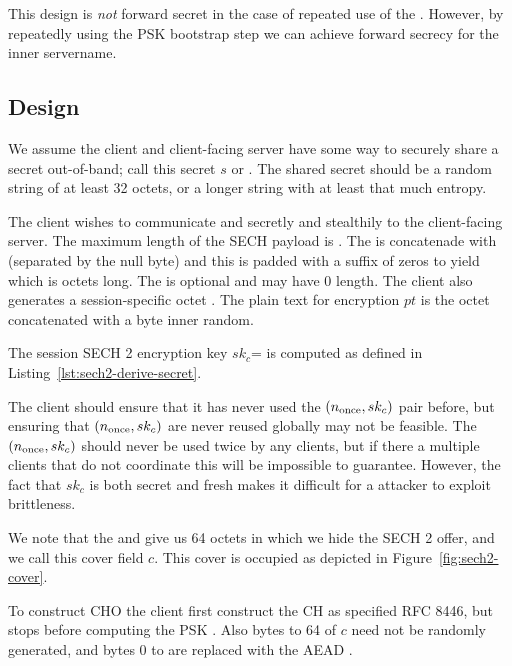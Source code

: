 This design is {\em not} forward secret in the case of repeated use of the \varsechlongtermkey{}.
However, by repeatedly using the \ac{PSK} bootstrap step we can achieve forward secrecy for the inner servername.

\subsection{Design}

We assume the client and client-facing server have some way to securely share a secret out-of-band; call this secret $s$ or \varsechlongtermkey{}.
The shared secret should be a random string of at least 32 octets, or a longer string with at least that much entropy.

The client wishes to communicate  and  secretly and stealthily to the client-facing server.
The maximum length of the \ac{SECH} payload is \sechtwoservernamelen{}.
The  is concatenade with  (separated by the null byte)
and this is padded
with a suffix of zeros to yield  which is \sechtwoservernamelen{} octets long.
The  is optional and may have 0 length.
The client also generates a session-specific \sechtwoivlen{} octet \nonce.
The plain text for encryption $pt$ is the \sechtwoservernamelen{} octet  concatenated with a \sechtworandomlen{} byte inner random.

The session \ac{SECH} 2 encryption key $sk_c$= is computed as defined in Listing~\ref{lst:sech2-derive-secret}.

The client should ensure that it has never used the $(\nonce,sk_c)$ pair before, but ensuring that $(\nonce,sk_c)$ are never reused globally may not be feasible.
The $(\nonce,sk_c)$ should never be used twice by any clients,
but if there a multiple clients that do not coordinate this will be impossible to guarantee.
However, the fact that $sk_c$ is both secret and fresh
makes it difficult for a attacker to exploit \nonce brittleness. %

We note that the  and \varlegacysessionid{} give us 64 octets in which we hide the \ac{SECH} 2 offer, and we call this cover field $c$.
This cover is occupied as depicted in Figure~\ref{fig:sech2-cover}.

To construct \ac{CHO} the client first construct the \ac{CH} as specified RFC 8446,
but stops before computing the \ac{PSK} .
Also bytes \sechtwocipheroffset{} to 64 of $c$ need not be randomly generated,
and bytes 0 to \sechtwocipheroffset{} are replaced with the \ac{AEAD} \nonce.

